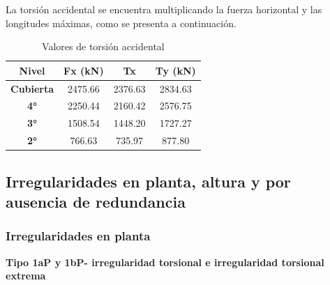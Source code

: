 \documentclass[12pt]{article}
\begin{document}
La torsión accidental se encuentra multiplicando la fuerza horizontal y las longitudes máximas, como se presenta a continuación.
\begin{table}[h]
  \centering
  
    \begin{tabular}{|c|c|c|c|}
    \hline
    \rowcolor[rgb]{ .2,  .247,  .31} \textcolor[rgb]{ 1,  1,  1}{\textbf{Nivel}} & \textcolor[rgb]{ 1,  1,  1}{\textbf{Fx (kN)}} & \textcolor[rgb]{ 1,  1,  1}{\textbf{Tx}} & \textcolor[rgb]{ 1,  1,  1}{\textbf{Ty (kN)}} \bigstrut\\
    \hline
    \rowcolor[rgb]{ .2,  .247,  .31} \textcolor[rgb]{ 1,  1,  1}{\textbf{Cubierta}} & \cellcolor[rgb]{ 1,  1,  1}2475.66 & \cellcolor[rgb]{ 1,  1,  1}2376.63 & \cellcolor[rgb]{ 1,  1,  1}2834.63 \bigstrut\\
    \hline
    \rowcolor[rgb]{ .2,  .247,  .31} \textcolor[rgb]{ 1,  1,  1}{\textbf{4°}} & \cellcolor[rgb]{ 1,  1,  1}2250.44 & \cellcolor[rgb]{ 1,  1,  1}2160.42 & \cellcolor[rgb]{ 1,  1,  1}2576.75 \bigstrut\\
    \hline
    \rowcolor[rgb]{ .2,  .247,  .31} \textcolor[rgb]{ 1,  1,  1}{\textbf{3°}} & \cellcolor[rgb]{ 1,  1,  1}1508.54 & \cellcolor[rgb]{ 1,  1,  1}1448.20 & \cellcolor[rgb]{ 1,  1,  1}1727.27 \bigstrut\\
    \hline
    \rowcolor[rgb]{ .2,  .247,  .31} \textcolor[rgb]{ 1,  1,  1}{\textbf{2°}} & \cellcolor[rgb]{ 1,  1,  1}766.63 & \cellcolor[rgb]{ 1,  1,  1}735.97 & \cellcolor[rgb]{ 1,  1,  1}877.80 \bigstrut\\
    \hline
    \end{tabular}%
    \caption{Valores de torsión accidental}
  \label{tab:TorsiónAccidental}%
\end{table}%

\subsection{Irregularidades en planta, altura y por ausencia de redundancia}

\subsubsection{Irregularidades en planta}
\textbf{Tipo 1aP y 1bP- irregularidad torsional e irregularidad torsional extrema}\\
\end{document}
